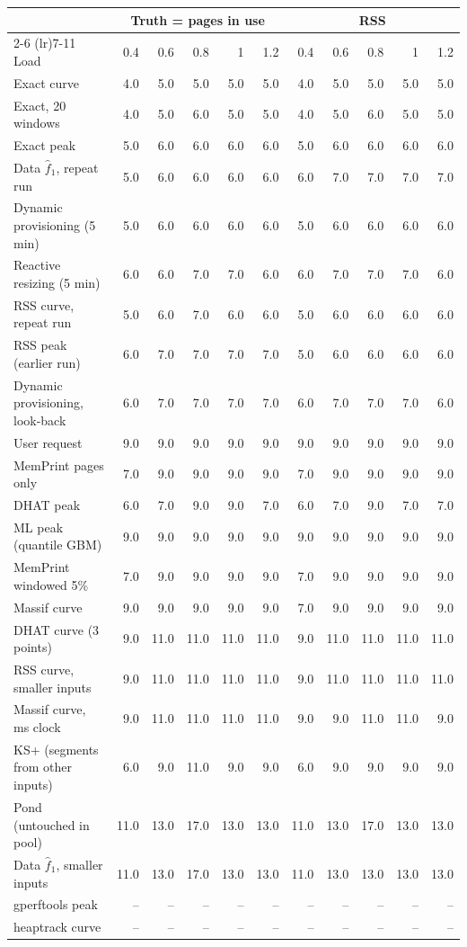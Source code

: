 \begin{tabular}{lrrrrrrrrrr}
\toprule
 & \multicolumn{5}{c}{Truth = pages in use} & \multicolumn{5}{c}{RSS} \\
\cmidrule(lr){2-6} \cmidrule(lr){7-11}
Load & 0.4 & 0.6 & 0.8 & 1 & 1.2 & 0.4 & 0.6 & 0.8 & 1 & 1.2 \\
\midrule
Exact curve & 4.0 & 5.0 & 5.0 & 5.0 & 5.0 & 4.0 & 5.0 & 5.0 & 5.0 & 5.0 \\
Exact, 20 windows & 4.0 & 5.0 & 6.0 & 5.0 & 5.0 & 4.0 & 5.0 & 6.0 & 5.0 & 5.0 \\
Exact peak & 5.0 & 6.0 & 6.0 & 6.0 & 6.0 & 5.0 & 6.0 & 6.0 & 6.0 & 6.0 \\
Data $\hat f_1$, repeat run & 5.0 & 6.0 & 6.0 & 6.0 & 6.0 & 6.0 & 7.0 & 7.0 & 7.0 & 7.0 \\
Dynamic provisioning (5 min) & 5.0 & 6.0 & 6.0 & 6.0 & 6.0 & 5.0 & 6.0 & 6.0 & 6.0 & 6.0 \\
Reactive resizing (5 min) & 6.0 & 6.0 & 7.0 & 7.0 & 6.0 & 6.0 & 7.0 & 7.0 & 7.0 & 6.0 \\
RSS curve, repeat run & 5.0 & 6.0 & 7.0 & 6.0 & 6.0 & 5.0 & 6.0 & 6.0 & 6.0 & 6.0 \\
RSS peak (earlier run) & 6.0 & 7.0 & 7.0 & 7.0 & 7.0 & 5.0 & 6.0 & 6.0 & 6.0 & 6.0 \\
Dynamic provisioning, look-back & 6.0 & 7.0 & 7.0 & 7.0 & 7.0 & 6.0 & 7.0 & 7.0 & 7.0 & 6.0 \\
User request & 9.0 & 9.0 & 9.0 & 9.0 & 9.0 & 9.0 & 9.0 & 9.0 & 9.0 & 9.0 \\
MemPrint pages only & 7.0 & 9.0 & 9.0 & 9.0 & 9.0 & 7.0 & 9.0 & 9.0 & 9.0 & 9.0 \\
DHAT peak & 6.0 & 7.0 & 9.0 & 9.0 & 7.0 & 6.0 & 7.0 & 9.0 & 7.0 & 7.0 \\
ML peak (quantile GBM) & 9.0 & 9.0 & 9.0 & 9.0 & 9.0 & 9.0 & 9.0 & 9.0 & 9.0 & 9.0 \\
MemPrint windowed 5\% & 7.0 & 9.0 & 9.0 & 9.0 & 9.0 & 7.0 & 9.0 & 9.0 & 9.0 & 9.0 \\
Massif curve & 9.0 & 9.0 & 9.0 & 9.0 & 9.0 & 7.0 & 9.0 & 9.0 & 9.0 & 9.0 \\
DHAT curve (3 points) & 9.0 & 11.0 & 11.0 & 11.0 & 11.0 & 9.0 & 11.0 & 11.0 & 11.0 & 11.0 \\
RSS curve, smaller inputs & 9.0 & 11.0 & 11.0 & 11.0 & 11.0 & 9.0 & 11.0 & 11.0 & 11.0 & 11.0 \\
Massif curve, ms clock & 9.0 & 11.0 & 11.0 & 11.0 & 11.0 & 9.0 & 9.0 & 11.0 & 11.0 & 9.0 \\
KS+ (segments from other inputs) & 6.0 & 9.0 & 11.0 & 9.0 & 9.0 & 6.0 & 9.0 & 9.0 & 9.0 & 9.0 \\
Pond (untouched in pool) & 11.0 & 13.0 & 17.0 & 13.0 & 13.0 & 11.0 & 13.0 & 17.0 & 13.0 & 13.0 \\
Data $\hat f_1$, smaller inputs & 11.0 & 13.0 & 17.0 & 13.0 & 13.0 & 11.0 & 13.0 & 13.0 & 13.0 & 13.0 \\
gperftools peak & -- & -- & -- & -- & -- & -- & -- & -- & -- & -- \\
heaptrack curve & -- & -- & -- & -- & -- & -- & -- & -- & -- & -- \\
\bottomrule
\end{tabular}
